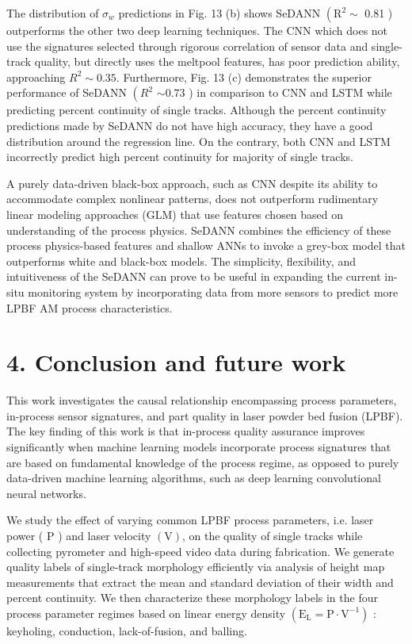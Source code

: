 \documentclass[10pt]{article}
\begin{document}
The distribution of $\sigma_{w}$ predictions in Fig. 13 (b) shows SeDANN $\left(\mathrm{R}^{2} \sim\right.$ 0.81 ) outperforms the other two deep learning techniques. The CNN which does not use the signatures selected through rigorous correlation of sensor data and single-track quality, but directly uses the meltpool features, has poor prediction ability, approaching $R^{2} \sim 0.35$. Furthermore, Fig. 13 (c) demonstrates the superior performance of SeDANN $\left(R^{2}\right.$ $\sim 0.73$ ) in comparison to CNN and LSTM while predicting percent continuity of single tracks. Although the percent continuity predictions made by SeDANN do not have high accuracy, they have a good distribution around the regression line. On the contrary, both CNN and LSTM incorrectly predict high percent continuity for majority of single tracks.

A purely data-driven black-box approach, such as CNN despite its ability to accommodate complex nonlinear patterns, does not outperform rudimentary linear modeling approaches (GLM) that use features chosen based on understanding of the process physics. SeDANN combines the efficiency of these process physics-based features and shallow ANNs to invoke a grey-box model that outperforms white and black-box models. The simplicity, flexibility, and intuitiveness of the SeDANN can prove to be useful in expanding the current in-situ monitoring system by incorporating data from more sensors to predict more LPBF AM process characteristics.

\section*{4. Conclusion and future work}
This work investigates the causal relationship encompassing process parameters, in-process sensor signatures, and part quality in laser powder bed fusion (LPBF). The key finding of this work is that in-process quality assurance improves significantly when machine learning models incorporate process signatures that are based on fundamental knowledge of the process regime, as opposed to purely data-driven machine learning algorithms, such as deep learning convolutional neural networks.

We study the effect of varying common LPBF process parameters, i.e. laser power ( $\mathrm{P}$ ) and laser velocity $(\mathrm{V})$, on the quality of single tracks while collecting pyrometer and high-speed video data during fabrication. We generate quality labels of single-track morphology efficiently via analysis of height map measurements that extract the mean and standard deviation of their width and percent continuity. We then characterize these morphology labels in the four process parameter regimes based on linear energy density $\left(\mathrm{E}_{\mathrm{L}}=\mathrm{P} \cdot \mathrm{V}^{-1}\right)$ : keyholing, conduction, lack-of-fusion, and balling.
\end{document}
